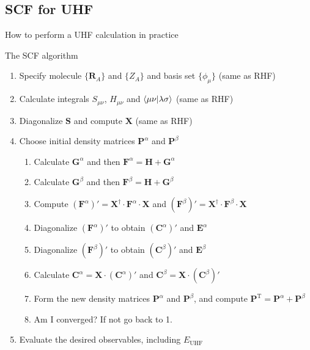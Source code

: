 \documentclass[aspectratio=169,9pt]{beamer}
\newcommand{\bR}{\boldsymbol{R}}
\newcommand{\bC}{\boldsymbol{C}}
\newcommand{\bE}{\boldsymbol{E}}
\newcommand{\bG}{\boldsymbol{G}}
\newcommand{\bP}{\boldsymbol{P}}
\newcommand{\bS}{\boldsymbol{S}}
\newcommand{\bF}{\boldsymbol{F}}
\newcommand{\bH}{\boldsymbol{H}}
\newcommand{\bX}{\boldsymbol{X}}
\begin{document}
\subsection{SCF for UHF}
\begin{frame}{How to perform a UHF calculation in practice}
	\begin{block}{The SCF algorithm}
		\begin{enumerate}
			\item \alert{Specify molecule} $\{\bR_A\}$ and $\{Z_A\}$ and \alert{basis set} $\{\phi_\mu\}$ \alert{(same as RHF)}
			\item Calculate integrals $S_{\mu \nu}$, $H_{\mu \nu}$ and $\braket{ \mu \nu }{ \lambda \sigma }$ \alert{(same as RHF)}
			\item Diagonalize $\bS$ and compute $\bX$ \alert{(same as RHF)}
			\item Choose \alert{initial density matrices} $\bP^\alpha$ and $\bP^\beta$
			\begin{enumerate}
				\item[1a.] Calculate $\bG^\alpha$ and then $\bF^\alpha = \bH + \bG^\alpha$
				\item[1b.] Calculate $\bG^\beta$ and then $\bF^\beta = \bH + \bG^\beta$
				\item[2.] Compute $(\bF^\alpha)' = \bX^\dag \cdot  \bF^\alpha \cdot \bX$ and $(\bF^\beta)' = \bX^\dag \cdot  \bF^\beta \cdot \bX$
				\item[3a.] Diagonalize $(\bF^\alpha)'$ to obtain $(\bC^\alpha)'$ and $\bE^\alpha$
				\item[3b.] Diagonalize $(\bF^\beta)'$ to obtain $(\bC^\beta)'$ and $\bE^\beta$
				\item[4.] Calculate $\bC^\alpha= \bX \cdot (\bC^\alpha)'$ and  $\bC^\beta= \bX \cdot (\bC^\beta)'$
				\item[5.] Form the \alert{new density matrices} $\bP^\alpha$ and $\bP^\beta$, and compute $\bP^\text{T} = \bP^\alpha + \bP^\beta$
				\item[6.] \alert{Am I converged?} If not go back to 1.
			\end{enumerate}
			\item Evaluate the desired observables, including $E_\text{UHF}$
		\end{enumerate}
	\end{block}
\end{frame}

\end{document}
